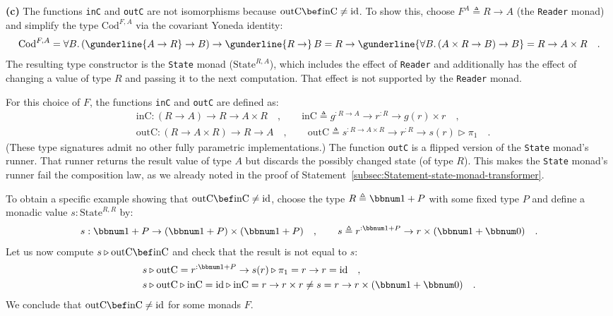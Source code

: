 \textbf{(c)} The functions \lstinline!inC! and \lstinline!outC!
are not isomorphisms because $\text{outC}\bef\text{inC}\not=\text{id}$.
To show this, choose $F^{A}\triangleq R\rightarrow A$ (the \lstinline!Reader!
monad) and simplify the type $\text{Cod}^{F,A}$ via the covariant
Yoneda identity:
\[
\text{Cod}^{F,A}=\forall B.\,(\gunderline{A\rightarrow R}\rightarrow B)\rightarrow\gunderline{R\rightarrow}\,B=R\rightarrow\gunderline{\forall B.\,(A\times R\rightarrow B)\rightarrow B}=R\rightarrow A\times R\quad.
\]
The resulting type constructor is the \lstinline!State! monad ($\text{State}^{R,A}$),
which includes the effect of \lstinline!Reader! and additionally
has the effect of changing a value of type $R$ and passing it to
the next computation. That effect is not supported by the \lstinline!Reader!
monad. 

For this choice of $F$, the functions \lstinline!inC! and \lstinline!outC!
are defined as:
\begin{align*}
 & \text{inC}:\left(R\rightarrow A\right)\rightarrow R\rightarrow A\times R\quad,\quad\quad\text{inC}\triangleq g^{:R\rightarrow A}\rightarrow r^{:R}\rightarrow g(r)\times r\quad,\\
 & \text{outC}:\left(R\rightarrow A\times R\right)\rightarrow R\rightarrow A\quad,\quad\quad\text{outC}\triangleq s^{:R\rightarrow A\times R}\rightarrow r^{:R}\rightarrow s(r)\triangleright\pi_{1}\quad.
\end{align*}
(These type signatures admit no other fully parametric implementations.)
The function \lstinline!outC! is a flipped version of the \lstinline!State!
monad\textsf{'}s runner. That runner returns the result value of type $A$
but discards the possibly changed state (of type $R$). This makes
the \lstinline!State! monad\textsf{'}s runner fail the composition law, as
we already noted in the proof of Statement~\ref{subsec:Statement-state-monad-transformer}.

To obtain a specific example showing that $\text{outC}\bef\text{inC}\neq\text{id}$,
choose the type $R\triangleq\bbnum 1+P$ with some fixed type $P$
and define a monadic value $s:\text{State}^{R,R}$ by:
\[
s:\bbnum 1+P\rightarrow(\bbnum 1+P)\times(\bbnum 1+P)\quad,\quad\quad s\triangleq r^{:\bbnum 1+P}\rightarrow r\times(\bbnum 1+\bbnum 0)\quad.
\]
Let us now compute $s\triangleright\text{outC}\bef\text{inC}$ and
check that the result is not equal to $s$:
\begin{align*}
 & s\triangleright\text{outC}=r^{:\bbnum 1+P}\rightarrow s(r)\triangleright\pi_{1}=r\rightarrow r=\text{id}\quad,\\
 & s\triangleright\text{outC}\triangleright\text{inC}=\text{id}\triangleright\text{inC}=r\rightarrow r\times r\neq s=r\rightarrow r\times(\bbnum 1+\bbnum 0)\quad.
\end{align*}
We conclude that $\text{outC}\bef\text{inC}\neq\text{id}$ for some
monads $F$.

